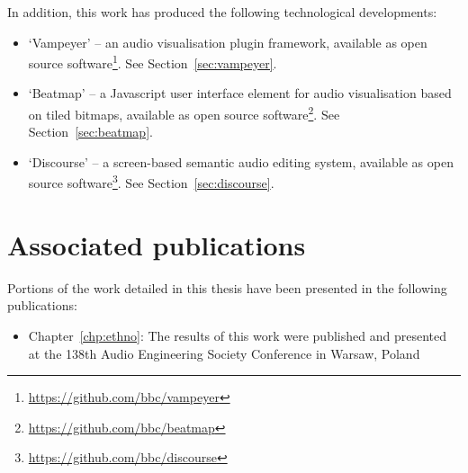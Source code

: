 In addition, this work has produced the following technological developments:

\begin{itemize}
  \item `Vampeyer' -- an audio visualisation plugin framework, available as open source
    software\footnote{\url{https://github.com/bbc/vampeyer}}. See Section~\ref{sec:vampeyer}.
  \item `Beatmap' -- a Javascript user interface element for audio visualisation based on tiled bitmaps, available as
    open source software\footnote{\url{https://github.com/bbc/beatmap}}. See Section~\ref{sec:beatmap}.
  \item `Discourse' -- a screen-based semantic audio editing system, available as open source
    software\footnote{\url{https://github.com/bbc/discourse}}. See Section~\ref{sec:discourse}.
\end{itemize}

\section{Associated publications}\label{sec:intro/publications}

Portions of the work detailed in this thesis have been presented in the following publications:

\begin{itemize}
  \item Chapter~\ref{chp:ethno}: The results of this work were published and presented at the 138th Audio Engineering Society Conference in
    Warsaw, Poland \citep{Baume2015}
\end{itemize}
